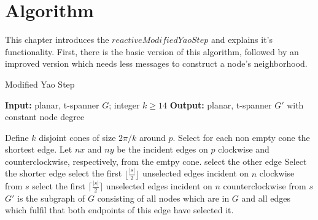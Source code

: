 \section{Algorithm}
This chapter introduces the $reactive Modified Yao Step $ and explains it's functionality.
First, there is the basic version of this algorithm, followed by an improved version which needs less messages to construct a node's neighborhood.
 
\algrenewcommand\algorithmicprocedure{\textbf{}}
\begin{algorithm}\small
\caption{Modified Yao Step}\label{MYS}
\begin{algorithmic}[0]
\Statex \textbf{Input:} planar, t-spanner $G $; integer $k\geq 14 $
\Statex \textbf{Output:} planar, t-spanner $G' $ with constant node degree

\Statex

	\State Define $k $ disjoint cones of size $2\pi/k $ around $p $.
	\State Select for each non empty cone the shortest edge.
			\State Let $nx $ and $ny $ be the incident edges on $p $ clockwise and \State counterclockwise, respectively, from the emtpy cone.
				\State select the other edge
				\Else
				\State Select the shorter edge
			\EndIf 
		\Else
			\State select the first $\lfloor \frac{|s|}{2} \rfloor $ unselected edges incident on $n $ clockwise from $s $
			\State select the first $\lceil \frac{|s|}{2} \rceil $ unselected edges incident on $n $ counterclockwise from $s $
		\EndIf
	\EndFor
\EndFor
\State $ G' $ is the subgraph of $G $ consisting of all nodes which are in $G $ and all edges which fulfil that both endpoints of this edge have selected it. 
\end{algorithmic}
\end{algorithm}





